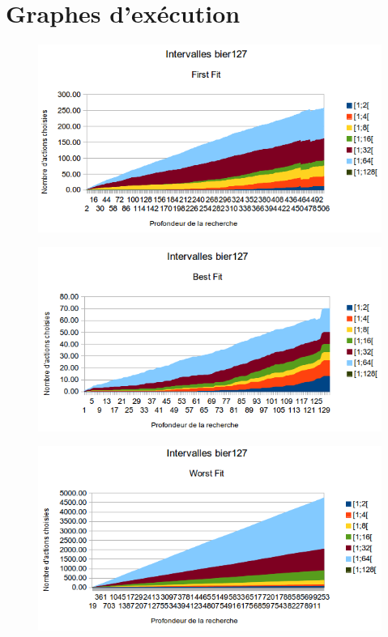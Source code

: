 \documentclass[a4paper,10pt]{report}
\begin{document}
\section{Graphes d'exécution}

\begin{figure}[h]
  \begin{center}
    \includegraphics[width=\textwidth]{images/bier127-intervals-first-fit.png}
  \end{center}
\end{figure}

\begin{figure}[h]
  \begin{center}
    \includegraphics[width=\textwidth]{images/bier127-intervals-best-fit.png}
  \end{center}
\end{figure}

\begin{figure}[h]
  \begin{center}
    \includegraphics[width=\textwidth]{images/bier127-intervals-worst-fit.png}
  \end{center}
\end{figure}
\end{document}
